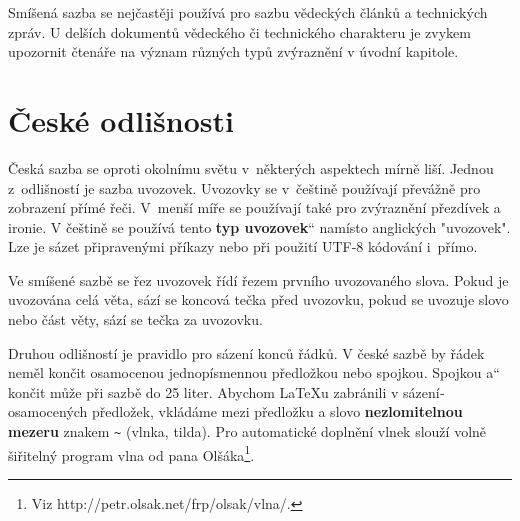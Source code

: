\documentclass[a4paper, 11pt, twocolumn]{article}
\providecommand{\uv} [1] {\quotedblbase #1\textquotedblleft}
\begin{document}
Smíšená sazba se nejčastěji používá pro sazbu vědeckých článků a technických zpráv. U delší­ch dokumentů vědeckého či technického charakteru je zvykem upozornit čtenáře na význam různých typů zvýraznění­ v úvodní­ kapitole.


\section{České odlišnosti}
Česká sazba se oproti okolní­mu světu v~některých aspektech mí­rně liší­. Jednou z~odlišností je sazba uvozovek. Uvozovky se v~češtině použí­vají­ převážně pro zobrazení­ pří­mé řeči. V~menší­ míře se použí­vají­ také pro zvýraznění­ přezdí­vek a ironie. V češtině se použí­vá tento \uv{\textbf{typ uvozovek}} namí­sto anglických "uvozovek". Lze je sázet připravenými příkazy nebo při použití UTF-8 kódování i~přímo.

Ve smíšené sazbě se řez uvozovek ří­dí­ řezem první­ho uvozovaného slova. Pokud je uvozována celá věta, sází­ se koncová tečka před uvozovku, pokud se uvozuje slovo nebo část věty, sází­ se tečka za uvozovku.

Druhou odlišností je pravidlo pro sázení­ konců řádků. V české sazbě by řádek neměl končit osamocenou jednopí­smennou předložkou nebo spojkou. Spojkou \uv{a} končit může při sazbě do 25 liter. Abychom LaTeXu zabránili v sázení­ osamocených předložek, vkládáme mezi předložku a slovo \textbf{nezlomitelnou mezeru} znakem \verb|~| (vlnka, tilda). Pro automatické doplnění vlnek slouží­ volně šiřitelný program vlna od pana Olšáka\footnote{Viz http://petr.olsak.net/frp/olsak/vlna/.}.
\end{document}
